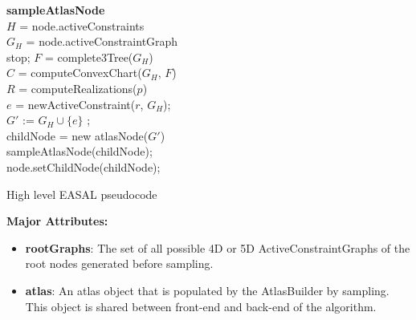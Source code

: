 \begin{algorithm} [htbp]

 {\bf sampleAtlasNode}\\
 \BlankLine
 \LinesNumbered
	$H$ = node.activeConstraints\\
	$G_H$ = node.activeConstraintGraph\\
		{stop;	}
	$F$ = complete3Tree($G_H$)\\
	
	$C$ = computeConvexChart($G_H$, $F$)\\

	{
		$R$ = computeRealizations($p$)\\

		{
			{
				{
					$e$ = newActiveConstraint($r$, $G_H$);\\
					$G'$ := $G_H \cup \{e\}$ ;\\
					{
						childNode = new atlasNode($G'$)\\
						sampleAtlasNode(childNode);\\
					} 
					node.setChildNode(childNode);
				} 
			}
		}
	}

	\caption{High level EASAL pseudocode}
\label{alg:sampleAtlasNode}
\end{algorithm}


\noindent \textbf{Major Attributes:} 
\begin{itemize}
		\item  \textbf{rootGraphs}: The set of all possible 4D or 5D
				ActiveConstraintGraphs of the root nodes
				generated before sampling.
		\item  \textbf{atlas}: An atlas object that is populated by the
				AtlasBuilder by sampling. This object is shared between front-end and
				back-end of the algorithm.
\end{itemize}

